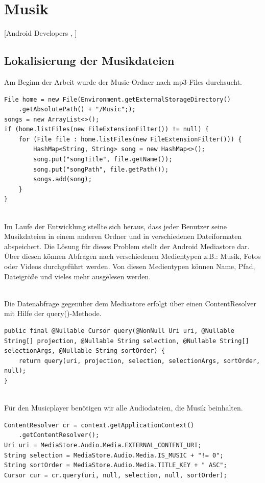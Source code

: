 \documentclass[FIPLY_base.tex]{subfiles}
\begin{document}
\section{Musik}
[Android Developers \cite{adMediaPlayer}, \citeauthor{bMediaPlayer} \cite{bMediaPlayer}]

\subsection{Lokalisierung der Musikdateien}
Am Beginn der Arbeit wurde der Music-Ordner nach mp3-Files durchsucht.
\begin{lstlisting}
File home = new File(Environment.getExternalStorageDirectory()
	.getAbsolutePath() + "/Music";);
songs = new ArrayList<>();
if (home.listFiles(new FileExtensionFilter()) != null) {
	for (File file : home.listFiles(new FileExtensionFilter())) {
		HashMap<String, String> song = new HashMap<>();
		song.put("songTitle", file.getName());
		song.put("songPath", file.getPath());
		songs.add(song);
	}
}    
\end{lstlisting}

\ \\
Im Laufe der Entwicklung stellte sich heraus, dass jeder Benutzer seine Musikdateien in einem anderen Ordner und in verschiedenen Dateiformaten abspeichert. 
Die Lösung für dieses Problem stellt der Android Mediastore dar. 
Über diesen können Abfragen nach verschiedenen Medientypen z.B.: Musik, Fotos oder Videos durchgeführt werden. Von diesen Medientypen können Name, Pfad, Dateigröße und vieles mehr ausgelesen werden.
  
\ \\  
Die Datenabfrage gegenüber dem Mediastore erfolgt über einen ContentResolver mit Hilfe der query()-Methode.
\begin{lstlisting}
public final @Nullable Cursor query(@NonNull Uri uri, @Nullable String[] projection, @Nullable String selection, @Nullable String[] selectionArgs, @Nullable String sortOrder) {
	return query(uri, projection, selection, selectionArgs, sortOrder, null);
}
\end{lstlisting}

\ \\
Für den Musicplayer benötigen wir alle Audiodateien, die Musik beinhalten.
\begin{lstlisting}
ContentResolver cr = context.getApplicationContext()
	.getContentResolver();
Uri uri = MediaStore.Audio.Media.EXTERNAL_CONTENT_URI;
String selection = MediaStore.Audio.Media.IS_MUSIC + "!= 0";
String sortOrder = MediaStore.Audio.Media.TITLE_KEY + " ASC";
Cursor cur = cr.query(uri, null, selection, null, sortOrder);
\end{lstlisting}
\end{document}
